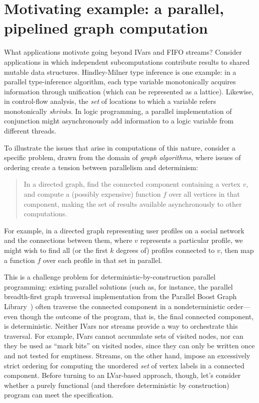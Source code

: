 \section{Motivating example: a parallel, pipelined graph computation}\label{s:lvars-motivation}

What applications motivate going beyond IVars and FIFO streams?
Consider applications in which independent subcomputations contribute
results to shared mutable data structures.  
Hindley-Milner type inference is one example: in a
parallel type-inference algorithm, each type variable monotonically
acquires information through unification (which can be represented as
a lattice). Likewise, in control-flow analysis, the \emph{set} of
locations to which a variable refers monotonically \emph{shrinks}.  In
logic programming, a parallel implementation of conjunction might
asynchronously add information to a logic variable from different
threads.

To illustrate the issues that arise in computations of this nature,
consider a specific problem, drawn from the domain of \emph{graph
  algorithms}, where issues of ordering create a tension between
parallelism and determinism:
\begin{quote}
  In a directed graph, find the connected component containing a
  vertex $v$, and compute a (possibly expensive) function $f$ over all
  vertices in that component, making the set of results available
  asynchronously to other computations.
\end{quote}
For example, in a directed graph representing user profiles on a
social network and the connections between them, where $v$ represents
a particular profile, we might wish to find all (or the first $k$
degrees of) profiles connected to $v$, then map a function $f$ over
each profile in that set in parallel.

This is a challenge problem for deterministic-by-construction parallel
programming: existing parallel solutions (such as, for instance, the
parallel breadth-first graph traversal implementation from the
Parallel Boost Graph Library~\cite{bfs-pbgl}) often traverse the
connected component in a nondeterministic order---even though the
outcome of the program, that is, the final connected component, is
deterministic.  Neither IVars nor streams provide a way 
to orchestrate this traversal.  For
example, IVars cannot accumulate sets of visited nodes, nor can they
be used as ``mark bits'' on visited nodes, since they can only be
written once and not tested for emptiness.  Streams, on the other
hand, impose an excessively strict ordering for computing the
unordered \emph{set} of vertex labels in a connected component.
Before turning to an LVar-based approach, though, let's consider
whether a purely functional (and therefore deterministic by
construction) program can meet the specification.

